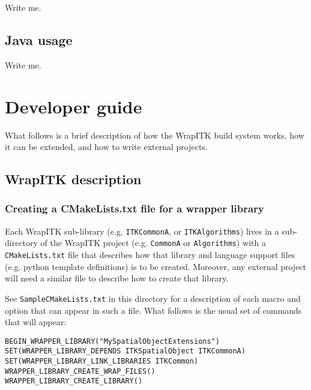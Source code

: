 \documentclass{InsightArticle}
\begin{document}
Write me.

    \subsection{Java usage}

Write me.

\section{Developer guide}

What follows is a brief description of how the WrapITK build system works, how
it can be extended, and how to write external projects.

  \subsection{WrapITK description}

     \subsubsection{Creating a CMakeLists.txt file for a wrapper library}
Each WrapITK sub-library (e.g. \verb$ITKCommonA$, or \verb$ITKAlgorithms$) lives in a
sub-directory of the WrapITK project (e.g. \verb$CommonA$ or \verb$Algorithms$) with a
\verb$CMakeLists.txt$ file that describes how that library  and language support files
(e.g. python template definitions) is to be created. Moreover, any external
project will need a similar file to describe how to create that library.

See \verb$SampleCMakeLists.txt$ in this directory for a description of each macro and
option that can appear in such a file. What follows is the usual set of commands
that will appear:

\small \begin{verbatim}
BEGIN_WRAPPER_LIBRARY("MySpatialObjectExtensions")
SET(WRAPPER_LIBRARY_DEPENDS ITKSpatialObject ITKCommonA)
SET(WRAPPER_LIBRARY_LINK_LIBRARIES ITKCommon)
WRAPPER_LIBRARY_CREATE_WRAP_FILES()
WRAPPER_LIBRARY_CREATE_LIBRARY()
\end{verbatim} \normalsize
\end{document}
